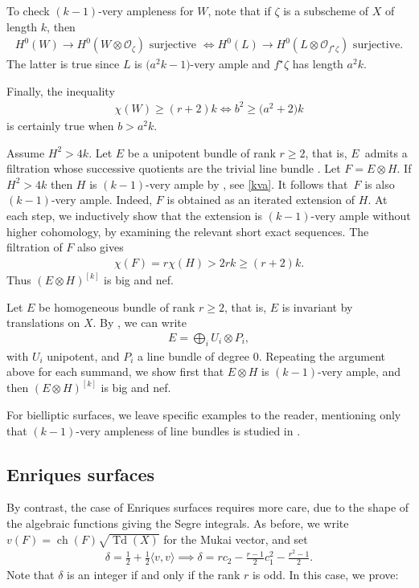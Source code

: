 \documentclass[10pt,a4paper]{amsart}
\numberwithin{equation}{section}
\begin{document}
\begin{Example}
To check $(k-1)$-very ampleness for $W$, note that if $\zeta$ is a subscheme of $X$ of length $k$, then \begin{gather*}
H^0(W)\to H^0(W\otimes\mathcal O_{\zeta}) \text{ surjective }\iff H^0(L)\to H^0(L\otimes \mathcal O_{f^{\star} \zeta}) \text { surjective}.
\end{gather*}
The latter is true since $L$ is $\big(a^2k-1\big)$-very ample and $f^{\star}\zeta$ has length $a^2k$.

Finally, the inequality
\begin{gather*}
\chi(W)\geq (r+2) k\iff b^2\geq \big(a^2+2\big)k
\end{gather*}
is certainly true when $b>a^2k$.
\end{Example}

\begin{Example} Assume $H^2>4k$. Let $E$ be a unipotent bundle of rank $r\geq 2$, that is, $E$~admits a filtration whose successive quotients are the trivial line bundle \cite[Definition~4.5]{M}. Let $F=E\otimes H$. If $H^2> 4k$ then $H$ is $(k-1)$-very ample by \cite[Theorem 2.1]{BS}, see \eqref{kva}. It follows that~$F$ is also $(k-1)$-very ample. Indeed, $F$ is obtained as an iterated extension of $H$. At each step, we inductively show that the extension is $(k-1)$-very ample without higher cohomology, by examining the relevant short exact sequences. The filtration of $F$ also gives
\begin{gather*}
\chi(F)=r\chi(H)> 2rk\geq (r+2)k.
\end{gather*}
Thus $(E\otimes H)^{[k]}$ is big and nef.

Let $E$ be homogeneous bundle of rank $r\geq 2$, that is, $E$ is invariant by translations on $X$. By \cite[Theorem 4.17]{M}, we can write
\begin{gather*}
E=\bigoplus_i U_i\otimes P_i,
\end{gather*}
with $U_i$ unipotent, and $P_i$ a line bundle of degree $0$. Repeating the argument above for each summand, we show first that $E\otimes H$ is $(k-1)$-very ample, and then $(E\otimes H)^{[k]}$ is big and nef.
\end{Example}

For bielliptic surfaces, we leave specific examples to the reader, mentioning only that $(k-1)$-very ampleness of line bundles is studied in \cite{MP}.

\subsection{Enriques surfaces} By contrast, the case of Enriques surfaces requires more care, due to the shape of the algebraic functions giving the Segre integrals. As before, we write $v(F)=\operatorname{ch}(F) \sqrt{\operatorname{Td}(X)}$ for the Mukai vector, and set
\begin{gather*}
\delta=\frac{1}{2}+\frac{1}{2}\langle v, v\rangle \implies \delta=rc_2-\frac{r-1}{2}c_1^2-\frac{r^2-1}{2}.
\end{gather*}
Note that $\delta$ is an integer if and only if the rank $r$ is odd. In this case, we prove:
\end{document}
